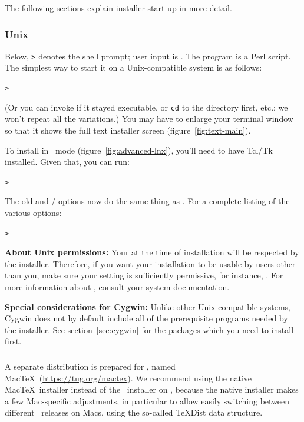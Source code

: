 \documentclass[12pt]{article}
\begin{document}
The following sections explain installer start-up in more detail.

\subsubsection{Unix}

Below, \texttt{>} denotes the shell prompt; user input is
.
The  program is a Perl script.  The simplest way
to start it on a Unix-compatible system is as follows:
\begin{alltt}
> 
\end{alltt}
(Or you can invoke  if it stayed
executable, or \texttt{cd} to the directory first, etc.; we won't repeat
all the variations.)  You may have to enlarge your terminal window so
that it shows the full text installer screen
(figure~\ref{fig:text-main}).

To install in \GUI\ mode (figure~\ref{fig:advanced-lnx}), you'll need to
have Tcl/Tk installed.  Given that, you can run:
\begin{alltt}
> 
\end{alltt}

The old  and / options
now do the same thing as . For
a complete listing of the various options:
\begin{alltt}
> 
\end{alltt}

\textbf{About Unix permissions:} Your  at the time
of installation will be respected by the \TL{} installer.  Therefore, if
you want your installation to be usable by users other than you, make
sure your setting is sufficiently permissive, for instance, .  For more information about , consult your system
documentation.

\textbf{Special considerations for Cygwin:} Unlike other
Unix-compatible systems, Cygwin does not by default include all of the
prerequisite programs needed by the \TL{} installer.  See
section~\ref{sec:cygwin} for the packages which you need to install first.


\subsubsection{\macOS}
\label{sec:macosx}

A separate distribution is prepared for \macOS, named Mac\TeX\
(\url{https://tug.org/mactex}). We recommend using the native Mac\TeX\
installer instead of the \TL\ installer on \macOS, because the native
installer makes a few Mac-specific adjustments, in particular to allow
easily switching between different \TL\ releases on Macs, using the
so-called \TeX{}Dist data structure.
\end{document}
